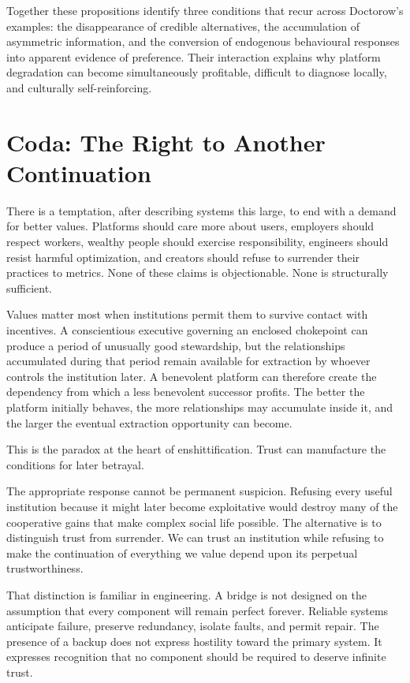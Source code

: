 \documentclass[11pt]{article}
\begin{document}
Together these propositions identify three conditions that recur across Doctorow's examples: the disappearance of credible alternatives, the accumulation of asymmetric information, and the conversion of endogenous behavioural responses into apparent evidence of preference. Their interaction explains why platform degradation can become simultaneously profitable, difficult to diagnose locally, and culturally self-reinforcing.

\section{Coda: The Right to Another Continuation}

There is a temptation, after describing systems this large, to end with a demand for better values. Platforms should care more about users, employers should respect workers, wealthy people should exercise responsibility, engineers should resist harmful optimization, and creators should refuse to surrender their practices to metrics. None of these claims is objectionable. None is structurally sufficient.

Values matter most when institutions permit them to survive contact with incentives. A conscientious executive governing an enclosed chokepoint can produce a period of unusually good stewardship, but the relationships accumulated during that period remain available for extraction by whoever controls the institution later. A benevolent platform can therefore create the dependency from which a less benevolent successor profits. The better the platform initially behaves, the more relationships may accumulate inside it, and the larger the eventual extraction opportunity can become.

This is the paradox at the heart of enshittification. Trust can manufacture the conditions for later betrayal.

The appropriate response cannot be permanent suspicion. Refusing every useful institution because it might later become exploitative would destroy many of the cooperative gains that make complex social life possible. The alternative is to distinguish trust from surrender. We can trust an institution while refusing to make the continuation of everything we value depend upon its perpetual trustworthiness.

That distinction is familiar in engineering. A bridge is not designed on the assumption that every component will remain perfect forever. Reliable systems anticipate failure, preserve redundancy, isolate faults, and permit repair. The presence of a backup does not express hostility toward the primary system. It expresses recognition that no component should be required to deserve infinite trust.
\end{document}
